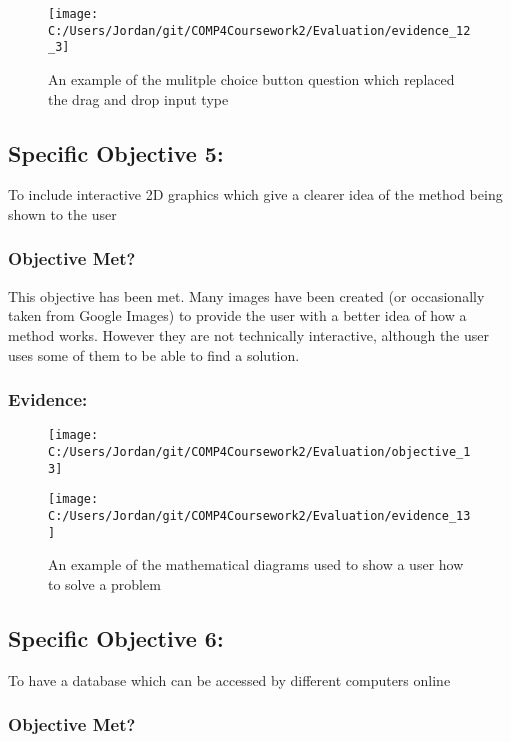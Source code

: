 \begin{figure}[H]
	\texttt{[image: C:/Users/Jordan/git/COMP4Coursework2/Evaluation/evidence\_12\_3]}
	\caption{An example of the mulitple choice button question which replaced the drag and drop input type}
\end{figure}

\subsection{Specific Objective 5: }

To include interactive 2D graphics which give a clearer idea of the method being shown to the user

\subsubsection{Objective Met?}

This objective has been met. Many images have been created (or occasionally taken from Google Images) to provide the user with a better idea of how a method works. However they are not technically interactive, although the user uses some of them to be able to find a solution.

\subsubsection{Evidence: }

\begin{figure}[H]
	\texttt{[image: C:/Users/Jordan/git/COMP4Coursework2/Evaluation/objective\_13]}
\end{figure}

\begin{figure}[H]
	\texttt{[image: C:/Users/Jordan/git/COMP4Coursework2/Evaluation/evidence\_13]}
	\caption{An example of the mathematical diagrams used to show a user how to solve a problem}
\end{figure}

\subsection{Specific Objective 6: }

To have a database which can be accessed by different computers online

\subsubsection{Objective Met?}

